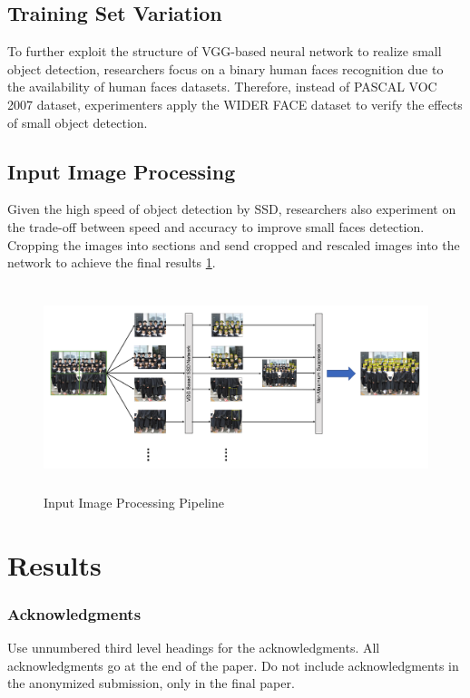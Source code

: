 \documentclass{article}
\begin{document}
\subsection{Training Set Variation}

To further exploit the structure of VGG-based neural network to realize small object detection, researchers focus on a binary human faces recognition due to the availability of human faces datasets. Therefore, instead of PASCAL VOC 2007 dataset, experimenters apply the WIDER FACE dataset to verify the effects of small object detection. 

\subsection{Input Image Processing}

Given the high speed of object detection by SSD, researchers also experiment on the trade-off between speed and accuracy to improve small faces detection. Cropping the images into sections and send cropped and rescaled images into the network to achieve the final results \ref{F4}.

\begin{figure}
	\centering
	\includegraphics[height=6cm]{datapreprocess.png}
	\caption{Input Image Processing Pipeline}	
	\label{F4}
	\end{figure}


\section{Results}





\subsubsection*{Acknowledgments}

Use unnumbered third level headings for the acknowledgments. All
acknowledgments go at the end of the paper. Do not include
acknowledgments in the anonymized submission, only in the final paper.
\end{document}
